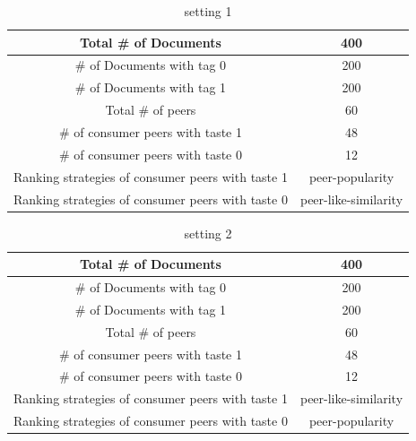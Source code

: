 \documentclass [12pt]{article} \usepackage{multicol}
\begin{document}
\begin{table}[h!]
\caption{setting 1}
\begin{center}


\begin{tabular}{|c|c|}
\hline

Total \# of Documents &  400  \\ \hline
\# of Documents with tag 0 &  200  \\ \hline
\# of Documents with tag 1 &  200  \\ \hline

Total \# of peers & 60 \\ \hline

\# of consumer peers with taste 1  & 48 \\ \hline 
\# of consumer peers with taste 0  &  12\\ \hline

Ranking strategies of consumer peers with taste 1  & peer-popularity \\ \hline 
Ranking strategies of consumer peers with taste 0  &  peer-like-similarity\\ \hline


\end{tabular}

\end{center}
\label{default}
\end{table}



\begin{table}[h!]
\caption{setting 2}
\begin{center}


\begin{tabular}{|c|c|}
\hline

Total \# of Documents &  400  \\ \hline
\# of Documents with tag 0 &  200  \\ \hline
\# of Documents with tag 1 &  200  \\ \hline

Total \# of peers & 60 \\ \hline
\# of consumer peers with taste 1  &  48 \\ \hline 
\# of consumer peers with taste 0  &  12 \\ \hline

Ranking strategies of consumer peers with taste 1  & peer-like-similarity \\ \hline 
Ranking strategies of consumer peers with taste 0  &  peer-popularity\\ \hline

\end{tabular}

\end{center}
\label{default}
\end{table}
\end{document}
